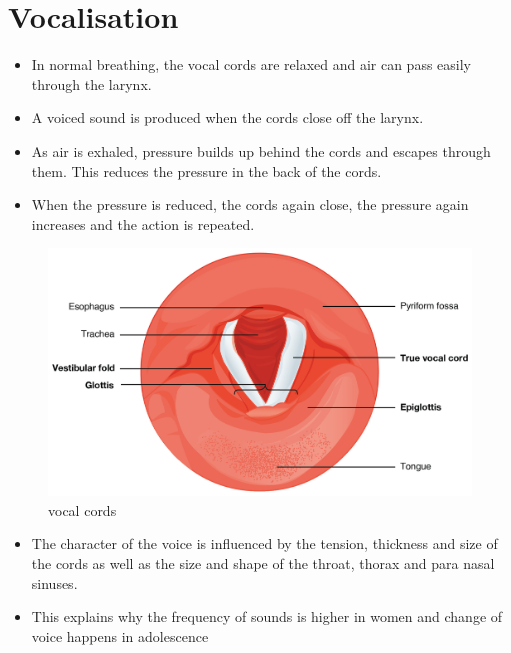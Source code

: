 \documentclass[12pt]{book}
\begin{document}
\chapter{Vocalisation}
\begin{itemize}
\item In normal breathing,
the vocal cords are relaxed and
air can pass easily through the larynx.

\item A voiced sound is produced when
the cords close off the larynx.

\item As air is exhaled,
pressure builds up behind the cords
and escapes through them.
This reduces the pressure in the back
of the cords.

\item When the pressure is reduced,
the cords again close,
the pressure again increases and
the action is repeated.
\end{itemize}
\begin{figure}[h]
\includegraphics[scale=1]{ vocalcord.jpeg}
\caption{vocal cords}
\end{figure}

\begin{itemize}
\item The character of the voice
is influenced by the tension, thickness
and size of the cords
as well as the size and shape
of the throat, thorax
and para nasal sinuses.

\item This explains why the frequency
of sounds is higher in women and change of voice happens in adolescence
\end{itemize}
\end{document}
